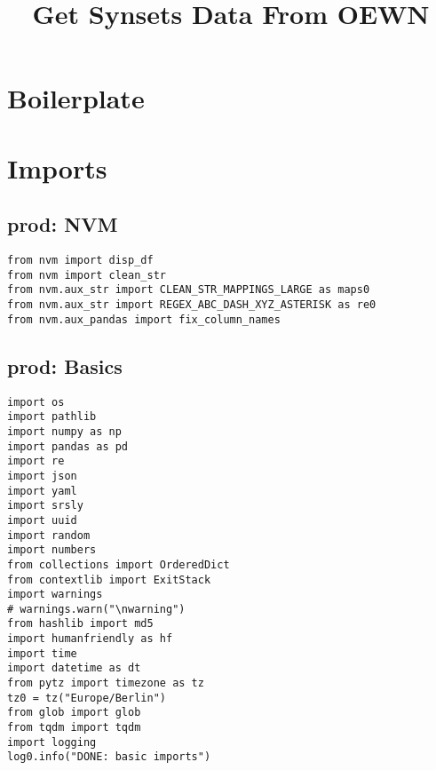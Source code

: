 \documentclass[a4paper,10pt,onecolumn,oneside,openright]{article}
\date{}
\title{Get Synsets Data From OEWN}
\begin{document}
\maketitle




\section{Boilerplate}
\label{sec:org9954c19}
\section{Imports}
\label{sec:org2af52a5}
\subsection{prod: NVM}
\label{sec:orgbb455db}
\begin{verbatim}
from nvm import disp_df
from nvm import clean_str
from nvm.aux_str import CLEAN_STR_MAPPINGS_LARGE as maps0
from nvm.aux_str import REGEX_ABC_DASH_XYZ_ASTERISK as re0
from nvm.aux_pandas import fix_column_names
\end{verbatim}

\subsection{prod: Basics}
\label{sec:orge3f5707}
\begin{verbatim}
import os
import pathlib
import numpy as np
import pandas as pd
import re
import json
import yaml
import srsly
import uuid
import random
import numbers
from collections import OrderedDict
from contextlib import ExitStack
import warnings
# warnings.warn("\nwarning")
from hashlib import md5
import humanfriendly as hf
import time
import datetime as dt
from pytz import timezone as tz
tz0 = tz("Europe/Berlin")
from glob import glob
from tqdm import tqdm
import logging
log0.info("DONE: basic imports")
\end{verbatim}
\end{document}
